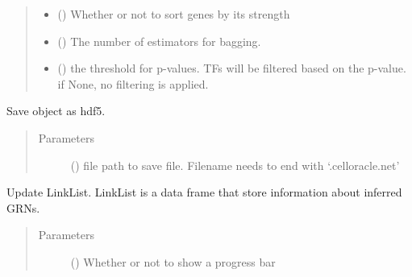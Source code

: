 \documentclass[letterpaper,10pt,english]{sphinxmanual}
\begin{document}
\begin{fulllineitems}
\begin{fulllineitems}
\begin{quote}
\begin{description}
\begin{itemize}
\item {} 
 () \textendash{} Whether or not to sort genes by its strength

\item {} 
 () \textendash{} The number of estimators for bagging.

\item {} 
 () \textendash{} the threshold for p-values. TFs will be filtered based on the p-value.
if None, no filtering is applied.

\end{itemize}

\end{description}\end{quote}

\end{fulllineitems}


\begin{fulllineitems}
\label{\detokenize{modules/celloracle:celloracle.Net.to_hdf5}}
Save object as hdf5.
\begin{quote}\begin{description}
\item[{Parameters}] \leavevmode
{} () \textendash{} file path to save file. Filename needs to end with ‘.celloracle.net’

\end{description}\end{quote}

\end{fulllineitems}


\begin{fulllineitems}
\label{\detokenize{modules/celloracle:celloracle.Net.updateLinkList}}
Update LinkList.
LinkList is a data frame that store information about inferred GRNs.
\begin{quote}\begin{description}
\item[{Parameters}] \leavevmode
{} () \textendash{} Whether or not to show a progress bar


\end{description}
\end{quote}
\end{fulllineitems}
\end{fulllineitems}
\end{document}
